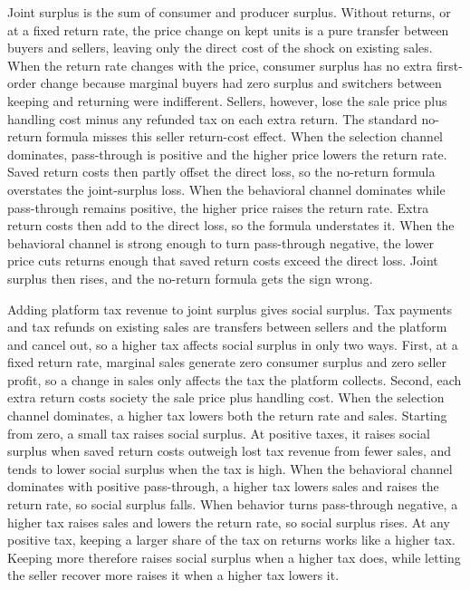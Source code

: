 \documentclass[11pt]{article}
\begin{document}
Joint surplus is the sum of consumer and producer surplus. Without returns, or
at a fixed return rate, the price change on kept units is a pure transfer
between buyers and sellers, leaving only the direct cost of the shock on
existing sales. When the return rate changes with the price, consumer surplus
has no extra first-order change because marginal buyers had zero surplus and
switchers between keeping and returning were indifferent. Sellers, however,
lose the sale price plus handling cost minus any refunded tax on each extra
return. The standard no-return formula misses this seller return-cost effect.
When the selection channel dominates, pass-through is positive and the higher
price lowers the return rate. Saved return costs then partly offset the direct
loss, so the no-return formula overstates the joint-surplus loss. When the
behavioral channel dominates while pass-through remains positive, the higher
price raises the return rate. Extra return costs then add to the direct loss,
so the formula understates it. When the behavioral channel is strong enough to
turn pass-through negative, the lower price cuts returns enough that saved
return costs exceed the direct loss. Joint surplus then rises, and the
no-return formula gets the sign wrong.

Adding platform tax revenue to joint surplus gives social surplus. Tax
payments and tax refunds on existing sales are transfers between sellers and
the platform and cancel out, so a higher tax affects social surplus in only
two ways. First, at a fixed return rate, marginal sales generate zero consumer
surplus and zero seller profit, so a change in sales only affects the tax the
platform collects. Second, each extra return costs society the sale price plus
handling cost. When the selection channel dominates, a higher tax lowers both
the return rate and sales. Starting from zero, a small tax raises social
surplus. At positive taxes, it raises social surplus when saved return costs
outweigh lost tax revenue from fewer sales, and tends to lower social surplus
when the tax is high. When the behavioral channel dominates with positive
pass-through, a higher tax lowers sales and raises the return rate, so social
surplus falls. When behavior turns pass-through negative, a higher tax raises
sales and lowers the return rate, so social surplus rises. At any positive
tax, keeping a larger share of the tax on returns works like a higher tax.
Keeping more therefore raises social surplus when a higher tax does, while
letting the seller recover more raises it when a higher tax lowers it.
\end{document}
